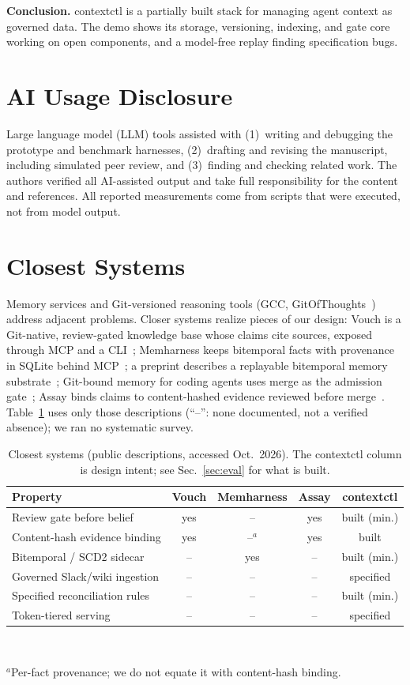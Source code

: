 \documentclass[conference,letterpaper]{IEEEtran}
\newcommand{\sysname}{contextctl}
\begin{document}
\textbf{Conclusion.} \sysname{} is a partially built stack for managing agent context as governed data. The demo shows its storage, versioning, indexing, and gate core working on open components, and a model-free replay finding specification bugs.

\section*{AI Usage Disclosure}
Large language model (LLM) tools assisted with (1)~writing and debugging the prototype and benchmark harnesses, (2)~drafting and revising the manuscript, including simulated peer review, and (3)~finding and checking related work. The authors verified all AI-assisted output and take full responsibility for the content and references. All reported measurements come from scripts that were executed, not from model output.

\appendices
\section{Closest Systems}\label{app:related}
Memory services and Git-versioned reasoning tools (GCC, GitOfThoughts~\cite{gcc,got}) address adjacent problems. Closer systems realize pieces of our design: Vouch is a Git-native, review-gated knowledge base whose claims cite sources, exposed through MCP and a CLI~\cite{vouch}; Memharness keeps bitemporal facts with provenance in SQLite behind MCP~\cite{memharness}; a preprint describes a replayable bitemporal memory substrate~\cite{bpma}; Git-bound memory for coding agents uses merge as the admission gate~\cite{rekal}; Assay binds claims to content-hashed evidence reviewed before merge~\cite{assay}. Table~\ref{tab:compare} uses only those descriptions (``--'': none documented, not a verified absence); we ran no systematic survey.

\begin{table}[h]
\caption{Closest systems (public descriptions, accessed Oct.\ 2026). The \sysname{} column is design intent; see Sec.~\ref{sec:eval} for what is built.}
\label{tab:compare}
\centering\scriptsize
\setlength{\tabcolsep}{2.5pt}
\begin{tabular}{@{}lcccc@{}}
\toprule
\textbf{Property} & \textbf{Vouch} & \textbf{Memharness} & \textbf{Assay} & \textbf{\sysname{}}\\
\midrule
Review gate before belief & yes & -- & yes & built (min.)\\
Content-hash evidence binding & yes & --$^{a}$ & yes & built\\
Bitemporal / SCD2 sidecar & -- & yes & -- & built (min.)\\
Governed Slack/wiki ingestion & -- & -- & -- & specified\\
Specified reconciliation rules & -- & -- & -- & built (min.)\\
Token-tiered serving & -- & -- & -- & specified\\
\bottomrule
\end{tabular}\\[2pt]
{\raggedright\scriptsize $^{a}$Per-fact provenance; we do not equate it with content-hash binding.\par}
\end{table}
\end{document}
